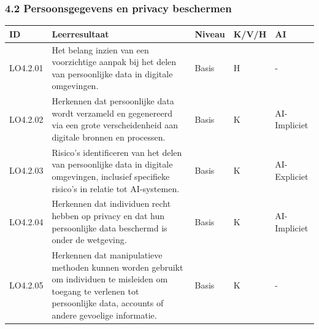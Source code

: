 \documentclass[
  dutch,
  letterpaper,
  DIV=11,
  numbers=noendperiod]{scrartcl}
\begin{document}
\subsubsection{4.2 Persoonsgegevens en privacy
beschermen}\label{persoonsgegevens-en-privacy-beschermen}

\begin{longtable}[]{@{}
  >{\centering\arraybackslash}p{}
  >{\centering\arraybackslash}p{}
  >{\centering\arraybackslash}p{}
  >{\centering\arraybackslash}p{}
  >{\centering\arraybackslash}p{}@{}}
\toprule\noalign{}
\begin{minipage}[b]{\linewidth}\centering
ID
\end{minipage} & \begin{minipage}[b]{\linewidth}\centering
Leerresultaat
\end{minipage} & \begin{minipage}[b]{\linewidth}\centering
Niveau
\end{minipage} & \begin{minipage}[b]{\linewidth}\centering
K/V/H
\end{minipage} & \begin{minipage}[b]{\linewidth}\centering
AI
\end{minipage} \\
\midrule\noalign{}
\endhead
\bottomrule\noalign{}
\endlastfoot
LO4.2.01 & Het belang inzien van een voorzichtige aanpak bij het delen
van persoonlijke data in digitale omgevingen. & Basis & H & - \\
LO4.2.02 & Herkennen dat persoonlijke data wordt verzameld en
gegenereerd via een grote verscheidenheid aan digitale bronnen en
processen. & Basis & K & AI-Impliciet \\
LO4.2.03 & Risico's identificeren van het delen van persoonlijke data in
digitale omgevingen, inclusief specifieke risico's in relatie tot
AI-systemen. & Basis & K & AI-Expliciet \\
LO4.2.04 & Herkennen dat individuen recht hebben op privacy en dat hun
persoonlijke data beschermd is onder de wetgeving. & Basis & K &
AI-Impliciet \\
LO4.2.05 & Herkennen dat manipulatieve methoden kunnen worden gebruikt
om individuen te misleiden om toegang te verlenen tot persoonlijke data,
accounts of andere gevoelige informatie. & Basis & K & - \\

\end{longtable}
\end{document}
